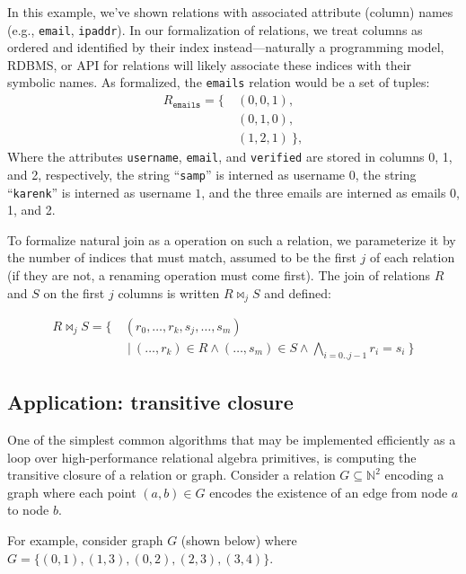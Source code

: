 In this example, we've shown relations with associated attribute (column) names (e.g., \texttt{email}, \texttt{ipaddr}). In our formalization of relations, we treat columns as ordered and identified by their index instead---naturally a programming model, RDBMS, or API for relations will likely associate these indices with their symbolic names. As formalized, the \texttt{emails} relation would be a set of tuples:
%
\begin{align*}
  R_\texttt{emails} = \{
  &
  \ (0,0,1),
  \\
  &\ (0,1,0),
  \\
  &\ (1,2,1)\ \},
\end{align*}
%
Where the attributes \texttt{username}, \texttt{email}, and \texttt{verified} are stored in columns 0, 1, and 2, respectively, the string ``\texttt{samp}'' is interned as username $0$, the string ``\texttt{karenk}'' is interned as username $1$, and the three emails are interned as emails 0, 1, and 2.  

To formalize natural join as a operation on such a relation, we parameterize it by the number of indices that must match, assumed to be the first $j$ of each relation (if they are not, a renaming operation must come first). The join of relations $R$ and $S$ on the first $j$ columns is written $R \bowtie_j S$ and defined:

\begin{align*}
  R \bowtie_j S = \{\ & (r_0,\ldots,r_k,s_j,\ldots,s_m)\
  \\
  &\ \vert\ (\ldots,r_k) \in R \wedge (\ldots,s_m) \in S \wedge \!\!\!\!\bigwedge_{i=0..{j-1}}\!\!\!\! r_i = s_i \ \}
\end{align*}

\subsection{Application: transitive closure}
\label{sec:ra:tc}
%
One of the simplest common algorithms that may be implemented efficiently as a loop over high-performance relational algebra primitives, is computing the transitive closure of a relation or graph. Consider a relation $G \subseteq \mathbb{N}^2$ encoding a graph where each point $(a,b) \in G$ encodes the existence of an edge from node $a$ to node $b$.

For example, consider graph $G$ (shown below) where \newline$G = \{(0,1), (1,3), (0,2), (2,3), (3,4)\}$. 

\begin{center}
\end{center}

